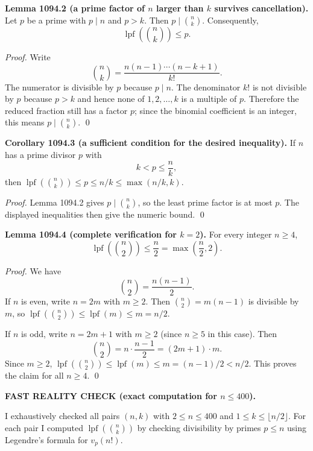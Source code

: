 \smallskip
\noindent\textbf{Lemma 1094.2 (a prime factor of $n$ larger than $k$ survives cancellation).}
Let $p$ be a prime with $p\mid n$ and $p>k$. Then $p\mid\binom{n}{k}$. Consequently,
\[
\operatorname{lpf}\!\left(\binom{n}{k}\right)\le p.
\]

\smallskip
\noindent\emph{Proof.}
Write
\[
\binom{n}{k}=\frac{n(n-1)\cdots(n-k+1)}{k!}.
\]
The numerator is divisible by $p$ because $p\mid n$. The denominator $k!$ is not divisible by $p$ because $p>k$ and hence none of $1,2,\dots,k$ is a multiple of $p$. Therefore the reduced fraction still has a factor $p$; since the binomial coefficient is an integer, this means $p\mid\binom{n}{k}$. \qed

\smallskip
\noindent\textbf{Corollary 1094.3 (a sufficient condition for the desired inequality).}
If $n$ has a prime divisor $p$ with
\[
k<p\le \frac{n}{k},
\]
then $\operatorname{lpf}(\binom{n}{k})\le p\le n/k\le \max(n/k,k)$.

\smallskip
\noindent\emph{Proof.}
Lemma 1094.2 gives $p\mid\binom{n}{k}$, so the least prime factor is at most $p$. The displayed inequalities then give the numeric bound. \qed

\smallskip
\noindent\textbf{Lemma 1094.4 (complete verification for $k=2$).}
For every integer $n\ge 4$,
\[
\operatorname{lpf}\!\left(\binom{n}{2}\right)\le \frac{n}{2} = \max\left(\frac{n}{2},2\right).
\]

\smallskip
\noindent\emph{Proof.}
We have
\[
\binom{n}{2}=\frac{n(n-1)}{2}.
\]
If $n$ is even, write $n=2m$ with $m\ge 2$. Then $\binom{n}{2}=m(n-1)$ is divisible by $m$, so $\operatorname{lpf}(\binom{n}{2})\le \operatorname{lpf}(m)\le m=n/2$.

If $n$ is odd, write $n=2m+1$ with $m\ge 2$ (since $n\ge 5$ in this case). Then
\[
\binom{n}{2}=n\cdot\frac{n-1}{2}=(2m+1)\cdot m.
\]
Since $m\ge 2$, $\operatorname{lpf}(\binom{n}{2})\le \operatorname{lpf}(m)\le m=(n-1)/2 < n/2$.
This proves the claim for all $n\ge 4$. \qed

\smallskip
\noindent\textbf{FAST REALITY CHECK (exact computation for $n\le 400$).}

\smallskip
\noindent
I exhaustively checked all pairs $(n,k)$ with $2\le n\le 400$ and $1\le k\le \lfloor n/2\rfloor$. For each pair I computed $\operatorname{lpf}(\binom{n}{k})$ by checking divisibility by primes $p\le n$ using Legendre's formula for $v_p(n!)$.

